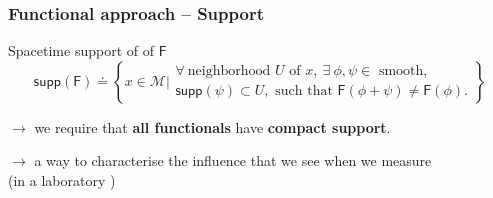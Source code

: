 \documentclass[9pt]{beamer}
\newcommand{\supp}{\mathsf{supp}} %
\newcommand{\Mcal}{\mathcal{M}}
\newcommand{\Fsf}{\mathsf{F}}
\begin{document}
\begin{frame}

\frametitle{Functional approach -- Support}

\vfill

\begin{block}{Spacetime support of of $\Fsf$}
%
\vspace*{-6pt}
%
\begin{equation*}
\supp(\Fsf) \doteq \left\{ x \in \Mcal \bigg| 
\begin{array}{l} 
\forall \ \mbox{neighborhood } U \mbox{ of } x, \ \exists \ \phi, \psi \in \mbox{ smooth}, \\
\supp(\psi) \subset U, \mbox{ such that } \Fsf(\phi + \psi) \neq \Fsf(\phi).
\end{array}
\right\}
\end{equation*}
%
\end{block}

\vfill

$\to$ we require that \textbf{all functionals} have \textbf{compact support}.

\vfill

$\to$ a way to characterise the influence that we see when we measure \\ (in a laboratory \smiley)

\vfill

\end{frame}

\end{document}
